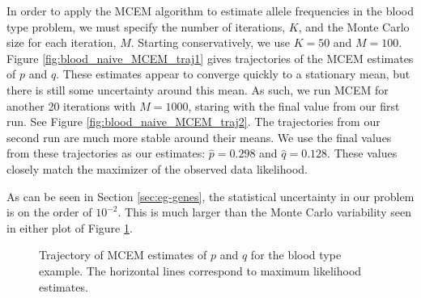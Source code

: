 \documentclass[11pt, oneside]{article}   	%
\begin{document}
In order to apply the MCEM algorithm to estimate allele frequencies in the blood type problem, we must specify the number of iterations, $K$, and the Monte Carlo size for each iteration, $M$. Starting conservatively, we use $K=50$ and $M=100$. Figure \ref{fig:blood_naive_MCEM_traj1} gives trajectories of the MCEM estimates of $p$ and $q$. These estimates appear to converge quickly to a stationary mean, but there is still some uncertainty around this mean. As such, we run MCEM for another 20 iterations with $M=1000$, staring with the final value from our first run. See Figure \ref{fig:blood_naive_MCEM_traj2}. The trajectories from our second run are much more stable around their means. We use the final values from these trajectories as our estimates: $\hat{p} = 0.298$ and $\hat{q} = 0.128$. These values closely match the maximizer of the observed data likelihood. 

As can be seen in Section \ref{sec:eg-genes}, the statistical uncertainty in our problem is on the order of $10^{-2}$. This is much larger than the Monte Carlo variability seen in either plot of Figure \ref{fig:blood_naive_MCEM_traj}.

   



\begin{figure}
    \centering
    \caption{Trajectory of MCEM estimates of $p$ and $q$ for the blood type example. The horizontal lines correspond to maximum likelihood estimates.}
    \label{fig:blood_naive_MCEM_traj}
    
\end{figure}
\end{document}
